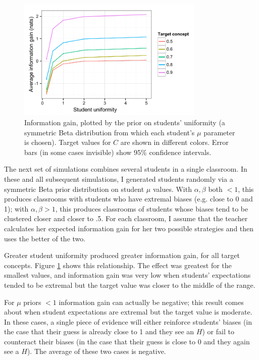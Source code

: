 \documentclass[10pt,letterpaper]{article}
\begin{document}
\begin{figure}[t]
\begin{center}
\includegraphics[width=3.5in]{figures/student_uniformity.pdf}
\end{center}
\vspace{-2ex}
\caption{\label{fig:uniformity} Information gain, plotted by the prior on students' uniformity (a symmetric Beta distribution from which each student's $\mu$ parameter is chosen). Target values for $C$ are shown in different colors. Error bars (in some cases invisible) show 95\% confidence intervals.}
\vspace{-2ex}
\end{figure}

The next set of simulations combines several students in a single classroom. In these and all subsequent simulations, I generated students randomly via a symmetric Beta prior distribution on student $\mu$ values. With $\alpha,\beta$ both $< 1$, this produces classrooms with students who have extremal biases (e.g. close to 0 and 1); with $\alpha,\beta>1$, this produces classrooms of students whose biases tend to be clustered closer and closer to .5. For each classroom, I assume that the teacher calculates her expected information gain for her two possible strategies and then uses the better of the two. 

Greater student uniformity produced greater information gain, for all target concepts. Figure \ref{fig:uniformity} shows this relationship. The effect was greatest for the smallest values, and information gain was very low when students' expectations tended to be extremal but the target value was closer to the middle of the range. 

For $\mu$ priors $< 1$ information gain can actually be negative; this result comes about when student expectations are extremal but the target value is moderate. In these cases, a single piece of evidence will either reinforce students' biases (in the case that their guess is already close to 1 and they see an $H$) or fail to counteract their biases (in the case that their guess is close to 0 and they again see a $H$). The average of these two cases is negative.
\end{document}
